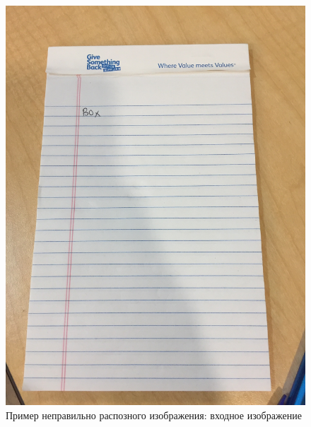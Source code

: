 \begin{figure}
    \includegraphics[scale=0.15]{img/perspective/wrong_input.JPG}
    \caption{Пример неправильно распозного изображения: входное изображение}
    \label{perspective_wrong_input}
\end{figure}

